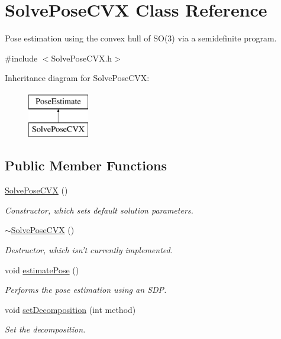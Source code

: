 \hypertarget{classSolvePoseCVX}{\section{\-Solve\-Pose\-C\-V\-X \-Class \-Reference}
\label{classSolvePoseCVX}
}


\-Pose estimation using the convex hull of \-S\-O(3) via a semidefinite program.  




{\ttfamily \#include $<$\-Solve\-Pose\-C\-V\-X.\-h$>$}

\-Inheritance diagram for \-Solve\-Pose\-C\-V\-X\-:\begin{figure}[H]
\begin{center}
\leavevmode
\includegraphics[height=2.000000cm]{classSolvePoseCVX}
\end{center}
\end{figure}
\subsection*{\-Public \-Member \-Functions}
\begin{DoxyCompactItemize}
\item 
\hyperlink{classSolvePoseCVX_a482baaffc4162260c7e565b1fa623007}{\-Solve\-Pose\-C\-V\-X} ()
\begin{DoxyCompactList}\small\item\em \-Constructor, which sets default solution parameters. \end{DoxyCompactList}\item 
\hyperlink{classSolvePoseCVX_a00a0ef0e4c0c55bde6d63c03c496082d}{$\sim$\-Solve\-Pose\-C\-V\-X} ()
\begin{DoxyCompactList}\small\item\em \-Destructor, which isn't currently implemented. \end{DoxyCompactList}\item 
void \hyperlink{classSolvePoseCVX_a081c857ff6c1c9e6597d41fb08bb6f16}{estimate\-Pose} ()
\begin{DoxyCompactList}\small\item\em \-Performs the pose estimation using an \-S\-D\-P. \end{DoxyCompactList}\item 
void \hyperlink{classSolvePoseCVX_a413870a9249a7f3b2ceb0ba52f68cb5f}{set\-Decomposition} (int method)
\begin{DoxyCompactList}\small\item\em \-Set the decomposition. \end{DoxyCompactList}\end{DoxyCompactItemize}

